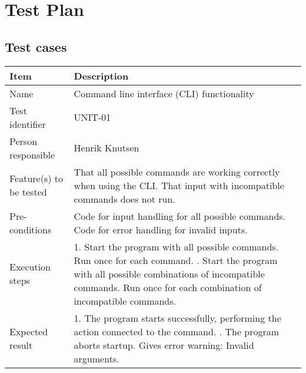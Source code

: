 \chapter{Test Plan}

	\section*{Test cases}
		\vspace{8 mm}		

		\begin{center}
			\begin{tabular}{ |  p{3.5cm} | p{10cm} | }
				\hline
				Item & Description \\ [5pt] \hline \hline
				Name & Command line interface (CLI) functionality \\  [5pt] \hline
				Test identifier & UNIT-01 \\  [5pt] \hline
				Person responsible & Henrik Knutsen \\  [5pt] \hline
				Feature(s) to be tested & That all possible commands are working correctly when using the CLI. That input with incompatible commands does not run. \\  [5pt] \hline
				Pre-conditions & Code for input handling for all possible commands. Code for error handling for invalid inputs. \\  [5pt] \hline
				Execution steps & 1. Start the program with all possible commands. Run once for each command. \newline 2. Start the program with all possible combinations of incompatible commands. Run once for each combination of incompatible commands. \\  [5pt] \hline
				Expected result & 1. The program starts successfully, performing the action connected to the command. \newline 2. The program aborts startup. Gives error warning: Invalid arguments. \\  [5pt] \hline
			\end{tabular}
		\end{center}

